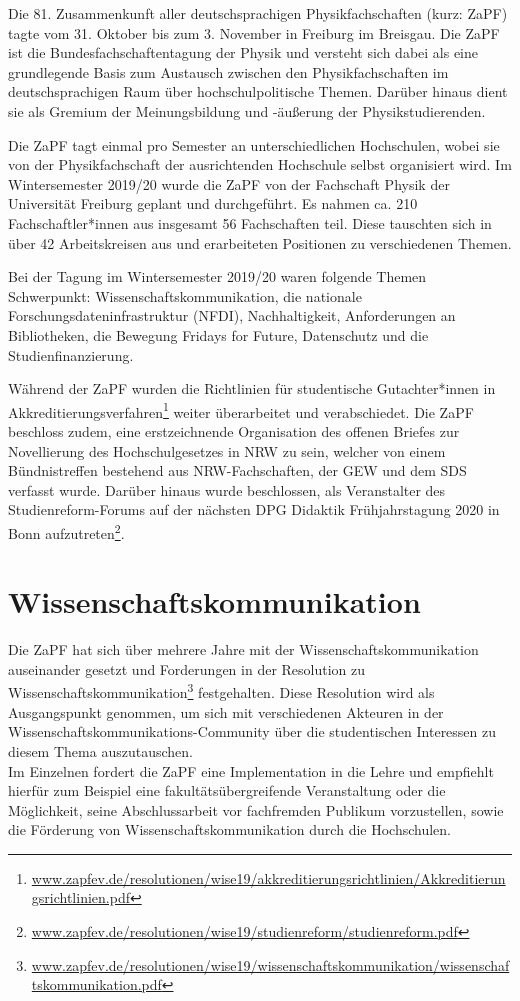 Die 81. Zusammenkunft aller deutschsprachigen Physikfachschaften (kurz: ZaPF) tagte vom 31. Oktober bis zum 3. November in Freiburg im Breisgau. Die ZaPF ist die Bundesfachschaftentagung der Physik und versteht sich dabei als eine grundlegende Basis zum Austausch zwischen den Physikfachschaften im deutschsprachigen Raum über hochschulpolitische Themen. Darüber hinaus dient sie als Gremium der Meinungsbildung und -äußerung der Physikstudierenden.

Die ZaPF tagt einmal pro Semester an unterschiedlichen Hochschulen, wobei sie von der Physikfachschaft der ausrichtenden Hochschule selbst organisiert wird. 
Im Wintersemester 2019/20 wurde die ZaPF von der Fachschaft Physik der Universität Freiburg geplant und durchgeführt.  
Es nahmen ca. 210 Fachschaftler*innen aus insgesamt 56 Fachschaften teil.
Diese tauschten sich in über 42 Arbeitskreisen aus und erarbeiteten Positionen zu verschiedenen Themen.

Bei der Tagung im Wintersemester 2019/20 waren folgende Themen Schwerpunkt: Wissenschaftskommunikation, die nationale Forschungsdateninfrastruktur (NFDI), Nachhaltigkeit, Anforderungen an Bibliotheken, die Bewegung Fridays for Future, Datenschutz und die Studienfinanzierung. 

Während der ZaPF wurden die Richtlinien für studentische Gutachter*innen in Akkreditierungsverfahren\footnote{\url{www.zapfev.de/resolutionen/wise19/akkreditierungsrichtlinien/Akkreditierungsrichtlinien.pdf}} weiter überarbeitet und verabschiedet. Die ZaPF beschloss zudem, eine erstzeichnende Organisation des offenen Briefes zur Novellierung des Hochschulgesetzes in NRW zu sein, welcher von einem Bündnistreffen bestehend aus NRW-Fachschaften, der GEW und dem SDS verfasst wurde. Darüber hinaus wurde beschlossen, als Veranstalter des Studienreform-Forums auf der nächsten DPG Didaktik Frühjahrstagung 2020 in Bonn aufzutreten\footnote{\url{www.zapfev.de/resolutionen/wise19/studienreform/studienreform.pdf}}.

\section*{Wissenschaftskommunikation}
Die ZaPF hat sich über mehrere Jahre mit der Wissenschaftskommunikation auseinander gesetzt und Forderungen in der Resolution zu Wissenschaftskommunikation\footnote{\url{www.zapfev.de/resolutionen/wise19/wissenschaftskommunikation/wissenschaftskommunikation.pdf}} festgehalten. Diese Resolution wird als Ausgangspunkt genommen, um sich mit verschiedenen Akteuren in der Wissenschaftskommunikations-Community über die studentischen Interessen zu diesem Thema auszutauschen.\\
Im Einzelnen fordert die ZaPF eine Implementation in die Lehre und empfiehlt hierfür zum Beispiel eine fakultätsübergreifende Veranstaltung oder die Möglichkeit, seine Abschlussarbeit vor fachfremden Publikum vorzustellen, sowie die Förderung von Wissenschaftskommunikation durch die Hochschulen.

